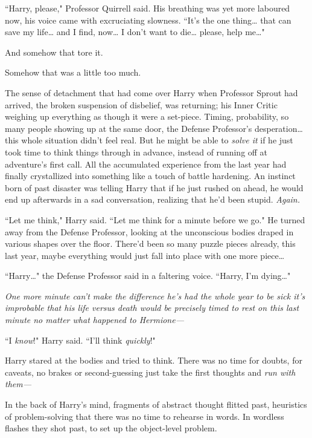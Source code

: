 ``Harry, please," Professor Quirrell said. His breathing was yet more laboured now, his voice came with excruciating slowness. ``It's the one thing{\ldots} that can save my life{\ldots} and I find, now{\ldots} I don't want to die{\ldots} please, help me{\ldots}"

And somehow that tore it.

Somehow that was a little too much.

The sense of detachment that had come over Harry when Professor Sprout had arrived, the broken suspension of disbelief, was returning; his Inner Critic weighing up everything as though it were a set-piece. Timing, probability, so many people showing up at the same door, the Defense Professor's desperation{\ldots} this whole situation didn't feel real. But he might be able to \emph{solve it} if he just took time to think things through in advance, instead of running off at adventure's first call. All the accumulated experience from the last year had finally crystallized into something like a touch of battle hardening. An instinct born of past disaster was telling Harry that if he just rushed on ahead, he would end up afterwards in a sad conversation, realizing that he'd been stupid. \emph{Again.}

``Let me think," Harry said. ``Let me think for a minute before we go." He turned away from the Defense Professor, looking at the unconscious bodies draped in various shapes over the floor. There'd been so many puzzle pieces already, this last year, maybe everything would just fall into place with one more piece{\ldots}

``Harry{\ldots}" the Defense Professor said in a faltering voice. ``Harry, I'm dying{\ldots}"

\emph{One more minute can't make the difference he's had the \emph{whole year} to be sick it's \emph{improbable} that his life versus death would be precisely timed to rest on this last minute no matter what happened to Hermione—}

``I \emph{know}!" Harry said. ``I'll think \emph{quickly}!"

Harry stared at the bodies and tried to think. There was no time for doubts, for caveats, no brakes or second-guessing just take the first thoughts and \emph{run with them—}

In the back of Harry's mind, fragments of abstract thought flitted past, heuristics of problem-solving that there was no time to rehearse in words. In wordless flashes they shot past, to set up the object-level problem.

